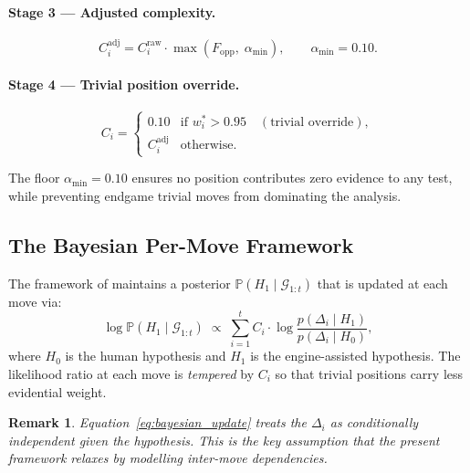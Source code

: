 \documentclass[11pt,a4paper]{article}
\newtheorem{remark}{Remark}
\newcommand{\Prob}{\mathbb{P}}
\begin{document}
\paragraph{Stage 3 --- Adjusted complexity.}
\begin{equation}
  C_i^{\mathrm{adj}} = C_i^{\mathrm{raw}} \cdot \max(F_{\mathrm{opp}},\; \alpha_{\min}),
  \qquad \alpha_{\min} = 0.10.
\end{equation}

\paragraph{Stage 4 --- Trivial position override.}
\begin{equation}
  C_i = \begin{cases}
    0.10 & \text{if } w^*_i > 0.95 \quad (\text{trivial override}), \\
    C_i^{\mathrm{adj}} & \text{otherwise.}
  \end{cases}
  \label{eq:cfinal}
\end{equation}

The floor $\alpha_{\min} = 0.10$ ensures no position contributes zero
evidence to any test, while preventing endgame trivial moves from
dominating the analysis.

\subsection{The Bayesian Per-Move Framework}

The framework of \citet{nguyen2025bayesian} maintains a posterior
$\Prob(H_1 \mid \mathcal{G}_{1:t})$ that is updated at each move via:
\begin{equation}
  \log \Prob(H_1 \mid \mathcal{G}_{1:t}) \;\propto\;
  \sum_{i=1}^{t} C_i \cdot \log \frac{p(\Delta_i \mid H_1)}{p(\Delta_i \mid H_0)},
  \label{eq:bayesian_update}
\end{equation}
where $H_0$ is the human hypothesis and $H_1$ is the engine-assisted
hypothesis. The likelihood ratio at each move is \emph{tempered} by $C_i$
so that trivial positions carry less evidential weight.

\begin{remark}
Equation~\eqref{eq:bayesian_update} treats the $\Delta_i$ as conditionally
independent given the hypothesis. This is the key assumption that the
present framework relaxes by modelling inter-move dependencies.
\end{remark}

\end{document}
